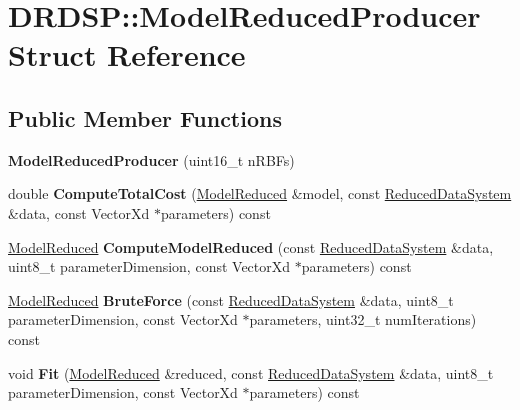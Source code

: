 \hypertarget{struct_d_r_d_s_p_1_1_model_reduced_producer}{\section{D\-R\-D\-S\-P\-:\-:Model\-Reduced\-Producer Struct Reference}
\label{struct_d_r_d_s_p_1_1_model_reduced_producer}
}
\subsection*{Public Member Functions}
\begin{DoxyCompactItemize}
\item 
\hypertarget{struct_d_r_d_s_p_1_1_model_reduced_producer_ae56451d134cc6789c5605bce0dbe005c}{{\bfseries Model\-Reduced\-Producer} (uint16\-\_\-t n\-R\-B\-Fs)}\label{struct_d_r_d_s_p_1_1_model_reduced_producer_ae56451d134cc6789c5605bce0dbe005c}

\item 
\hypertarget{struct_d_r_d_s_p_1_1_model_reduced_producer_aef28bf6e7d463b6891a49be22e1a292f}{double {\bfseries Compute\-Total\-Cost} (\hyperlink{struct_d_r_d_s_p_1_1_model_reduced}{Model\-Reduced} \&model, const \hyperlink{struct_d_r_d_s_p_1_1_reduced_data_system}{Reduced\-Data\-System} \&data, const Vector\-Xd $\ast$parameters) const }\label{struct_d_r_d_s_p_1_1_model_reduced_producer_aef28bf6e7d463b6891a49be22e1a292f}

\item 
\hypertarget{struct_d_r_d_s_p_1_1_model_reduced_producer_a8c3f3e9c4261bb92362fa6bb41b9a0d4}{\hyperlink{struct_d_r_d_s_p_1_1_model_reduced}{Model\-Reduced} {\bfseries Compute\-Model\-Reduced} (const \hyperlink{struct_d_r_d_s_p_1_1_reduced_data_system}{Reduced\-Data\-System} \&data, uint8\-\_\-t parameter\-Dimension, const Vector\-Xd $\ast$parameters) const }\label{struct_d_r_d_s_p_1_1_model_reduced_producer_a8c3f3e9c4261bb92362fa6bb41b9a0d4}

\item 
\hypertarget{struct_d_r_d_s_p_1_1_model_reduced_producer_a509fca4a7d4fcf6c62edb061eaad6352}{\hyperlink{struct_d_r_d_s_p_1_1_model_reduced}{Model\-Reduced} {\bfseries Brute\-Force} (const \hyperlink{struct_d_r_d_s_p_1_1_reduced_data_system}{Reduced\-Data\-System} \&data, uint8\-\_\-t parameter\-Dimension, const Vector\-Xd $\ast$parameters, uint32\-\_\-t num\-Iterations) const }\label{struct_d_r_d_s_p_1_1_model_reduced_producer_a509fca4a7d4fcf6c62edb061eaad6352}

\item 
\hypertarget{struct_d_r_d_s_p_1_1_model_reduced_producer_aee82ad4aa16823c53056004a0c6f035e}{void {\bfseries Fit} (\hyperlink{struct_d_r_d_s_p_1_1_model_reduced}{Model\-Reduced} \&reduced, const \hyperlink{struct_d_r_d_s_p_1_1_reduced_data_system}{Reduced\-Data\-System} \&data, uint8\-\_\-t parameter\-Dimension, const Vector\-Xd $\ast$parameters) const }\label{struct_d_r_d_s_p_1_1_model_reduced_producer_aee82ad4aa16823c53056004a0c6f035e}

\end{DoxyCompactItemize}
